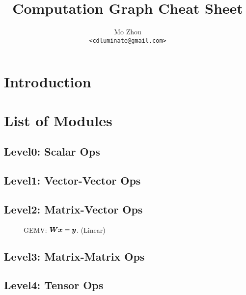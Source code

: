 \documentclass[9pt,twocolumn,times]{article}
\title{Computation Graph Cheat Sheet}
\author{Mo Zhou\\\small\texttt{<cdluminate@gmail.com>}}
\begin{document}
\maketitle

\section{Introduction}

\section{List of Modules}

\subsection{Level0: Scalar Ops}

\subsection{Level1: Vector-Vector Ops}

\subsection{Level2: Matrix-Vector Ops}

\begin{figure}[h]
	\centering
	\resizebox{0.618\columnwidth}{!}{%
		
	}
	\caption{GEMV: ${\bm{W}} {\bm{x}} = {\bm{y}}$. (Linear)}
\end{figure}

\subsection{Level3: Matrix-Matrix Ops}

\subsection{Level4: Tensor Ops}
\end{document}

